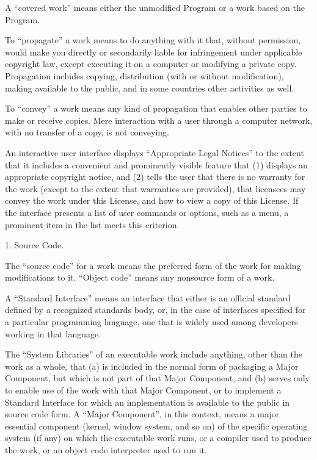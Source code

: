 \documentclass[letterpaper,10pt,english]{sphinxmanual}
\begin{document}
\begin{sphinxVerbatim}[commandchars=\\\{\}]
   A “covered work” means either the unmodified Program or a work based on the
   Program.

   To “propagate” a work means to do anything with it that, without permission,
   would make you directly or secondarily liable for infringement under
   applicable copyright law, except executing it on a computer or modifying a
   private copy. Propagation includes copying, distribution (with or without
   modification), making available to the public, and in some countries other
   activities as well.

   To “convey” a work means any kind of propagation that enables other parties
   to make or receive copies. Mere interaction with a user through a computer
   network, with no transfer of a copy, is not conveying.

   An interactive user interface displays “Appropriate Legal Notices” to the
   extent that it includes a convenient and prominently visible feature
   that (1) displays an appropriate copyright notice, and (2) tells the user
   that there is no warranty for the work (except to the extent that warranties
   are provided), that licensees may convey the work under this License, and
   how to view a copy of this License. If the interface presents a list of user
   commands or options, such as a menu, a prominent item in the list meets this
   criterion.

 1. Source Code.

   The “source code” for a work means the preferred form of the work for making
   modifications to it. “Object code” means any non\PYGZhy{}source form of a work.

   A “Standard Interface” means an interface that either is an official
   standard defined by a recognized standards body, or, in the case of
   interfaces specified for a particular programming language, one that is
   widely used among developers working in that language.

   The “System Libraries” of an executable work include anything, other than
   the work as a whole, that (a) is included in the normal form of packaging a
   Major Component, but which is not part of that Major Component, and (b)
   serves only to enable use of the work with that Major Component, or to
   implement a Standard Interface for which an implementation is available to
   the public in source code form. A “Major Component”, in this context, means
   a major essential component (kernel, window system, and so on) of the
   specific operating system (if any) on which the executable work runs, or a
   compiler used to produce the work, or an object code interpreter used to run
   it.


\end{sphinxVerbatim}
\end{document}
